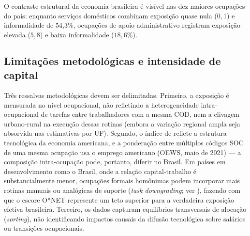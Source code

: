 O contraste estrutural da economia brasileira é visível nas dez maiores ocupações do país: enquanto serviços domésticos combinam exposição quase nula ($0{,}1$) e informalidade de 54{,}3\%, ocupações de apoio administrativo registram exposição elevada ($5{,}8$) e baixa informalidade ($18{,}6\%$).

\subsection{Limitações metodológicas e intensidade de capital}

Três ressalvas metodológicas devem ser delimitadas. Primeiro, a exposição é mensurada no nível ocupacional, não refletindo a heterogeneidade intra-ocupacional de tarefas entre trabalhadores com a mesma COD, nem a clivagem urbano-rural na execução dessas rotinas (embora a variação regional ampla seja absorvida nas estimativas por UF). Segundo, o índice de \citet{eloundou2024gpts} reflete a estrutura tecnológica da economia americana, e a ponderação entre múltiplos códigos SOC de uma mesma ocupação usa o emprego americano (OEWS, maio de 2021) --- a composição intra-ocupação pode, portanto, diferir no Brasil. Em países em desenvolvimento como o Brasil, onde a relação capital-trabalho é substancialmente menor, ocupações formais homônimas podem incorporar mais rotinas manuais ou analógicas de suporte (\emph{task downgrading}; ver \citealt{dicarlo2016task}), fazendo com que o escore O*NET represente um teto superior para a verdadeira exposição efetiva brasileira. Terceiro, os dados capturam equilíbrios transversais de alocação (\emph{sorting}), não identificando impactos causais da difusão tecnológica sobre salários ou transições ocupacionais.
